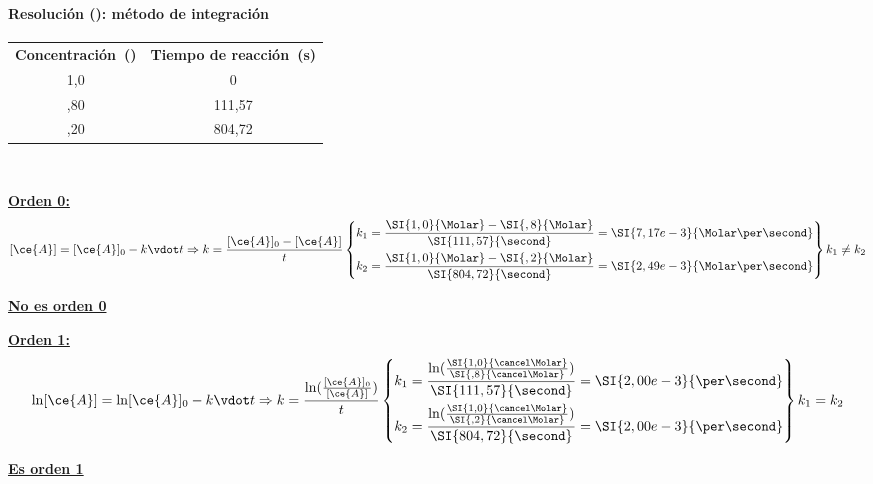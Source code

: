 \begin{frame}
	\frametitle{\ejerciciocmd}
	\framesubtitle{Resolución (): método de integración}
	\begin{center}
		\begin{tabular}{SS}
			{\textbf{Concentración~(\si{\Molar})}}			&
			{\textbf{Tiempo de reacción~(\si{\second})}}	\\
			1,0								&	  0			\\
			,80								&	111,57		\\
			,20								&	804,72		\\
		\end{tabular}
	\end{center}
	\\[.2cm]
	\begin{overprint}
			\underline{\textbf{\color{red!50!black}Orden 0:}}
			$$
				[\ce{A}] = [\ce{A}]_0 - k\vdot t\Rightarrow
				k = \frac{[\ce{A}]_0 - [\ce{A}]}{t}\left\{
				\begin{aligned}
					k_1 = \frac{\SI{1,0}{\Molar} - \SI{,8}{\Molar}}{\SI{111,57}{\second}} &= \SI{7,17e-3}{\Molar\per\second}	\\
					k_2 = \frac{\SI{1,0}{\Molar} - \SI{,2}{\Molar}}{\SI{804,72}{\second}} &= \SI{2,49e-3}{\Molar\per\second}
				\end{aligned}
				\right\} k_1\neq k_2
			$$
			\begin{center}
				\underline{\textbf{No es orden 0}}
			\end{center}
			\underline{\textbf{\color{red!50!black}Orden 1:}}
			$$
				\ln[\ce{A}] = \ln[\ce{A}]_0 - k\vdot t\Rightarrow
				k = \frac{\ln(\frac{[\ce{A}]_0}{[\ce{A}]})}{t}\left\{
				\begin{aligned}
					k_1 = \frac{\ln(\frac{\SI{1,0}{\cancel\Molar}}{\SI{,8}{\cancel\Molar}})}{\SI{111,57}{\second}} &= \SI{2,00e-3}{\per\second}\\
					k_2 = \frac{\ln(\frac{\SI{1,0}{\cancel\Molar}}{\SI{,2}{\cancel\Molar}})}{\SI{804,72}{\second}} &= \SI{2,00e-3}{\per\second}
				\end{aligned}
				\right\} k_1 = k_2
			$$
			\begin{center}
				\underline{\textbf{Es orden 1}}\qquad{}
			\end{center}
	\end{overprint}
\end{frame}